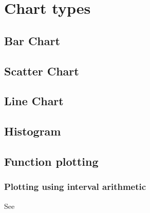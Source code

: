 \chapter{Chart types}

\section{Bar Chart}

\section{Scatter Chart}

\section{Line Chart}

\section{Histogram}

\section{Function plotting}

\subsection{Plotting using interval arithmetic}
See \cite{shou05, fateman92, martin02}
